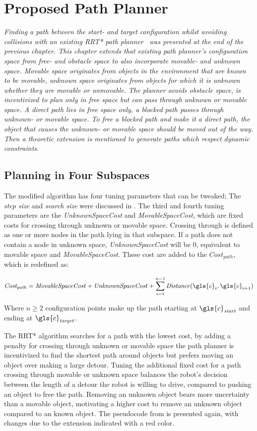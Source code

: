 \chapter{Proposed Path Planner}%
\label{chap:proposed_planning}
\textit{Finding a path between the start- and target configuration whilst avoiding collisions with an existing \ac{RRT*} path planner~\cite{chen_fast_2018} was presented at the end of the previous chapter. This chapter extends that existing path planner's configuration space from free- and obstacle space to also incorporate movable- and unknown space. Movable space originates from objects in the environment that are known to be movable, unknown space originates from objects for which it is unknown whether they are movable or unmovable. The planner avoids obstacle space, is incentivized to plan only in free space but can pass through unknown or movable space. A direct path lies in free space only, a blocked path passes through unknown- or movable space. To free a blocked path and make it a direct path, the object that causes the unknown- or movable space should be moved out of the way. Then a theoretic extension is mentioned to generate paths which respect dynamic constraints.\bs}

\section{Planning in Four Subspaces}\label{sec:planning_in_four_subspaces}
The modified algorithm has four tuning parameters that can be tweaked; The \textit{step size} and \textit{search size} were discussed in . The third and fourth tuning parameters are the \textit{UnknownSpaceCost} and \textit{MovableSpaceCost}, which are fixed costs for crossing through unknown or movable space. Crossing through is defined as one or more nodes in the path lying in that subspace. If a path does not contain a node in unknown space, \textit{UnknownSpaceCost} will be 0, equivalent to movable space and \textit{MovableSpaceCost}. These cost are added to the $\mathit{Cost_{path}}$, which is redefined as:\bs

\[\mathit{Cost_{path}} = \mathit{MovableSpaceCost} + \mathit{UnknownSpaceCost} + \sum_{i=1}^{n-1} \mathit{Distance}(\gls{c}_i, \gls{c}_{i+1})\]


Where $\mathit{n} \geq 2$ configuration points make up the path starting at $\gls{c}_\mathit{start}$ and ending at $\gls{c}_\mathit{target}$.\bs

The \ac{RRT*} algorithm searches for a path with the lowest cost, by adding a penalty for crossing through unknown or movable space the path planner is incentivized to find the shortest path around objects but prefers moving an object over making a large detour. Tuning the additional fixed cost for a path crossing through movable or unknown space balances the robot's decision between the length of a detour the robot is willing to drive, compared to pushing an object to free the path. Removing an unknown object bears more uncertainty than a movable object, motivating a higher cost to remove an unknown object compared to an known object. The pseudocode from  is presented again, with changes due to the extension indicated with a red color.\bs

